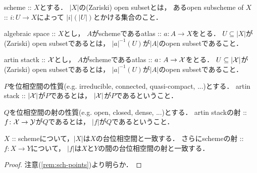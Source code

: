 \documentclass[a4paper, dvipdfmx]{jsarticle}
\begin{document}
\begin{Def}
\begin{myenum}
    \item
        scheme :: $X$とする．
        $|X|$の(Zariski) open subsetとは，
        あるopen subscheme of $X$ :: $i \colon U \to X$によって
        $|i|(|U|)$とかける集合のこと．

    \item
        algebraic space :: $X$とし，
        $A$がschemeであるatlas :: $a \colon A \to X$をとる．
        $U \subseteq |X|$が(Zariski) open subsetであるとは，
        $|a|^{-1}(U)$が$|A|$のopen subsetであること．

    \item
        artin stactk :: $\mathcal{X}$とし，
        $A$がschemeであるatlas :: $a \colon A \to \mathcal{X}$をとる．
        $U \subseteq |\mathcal{X}|$が(Zariski) open subsetであるとは，
        $|a|^{-1}(U)$が$|A|$のopen subsetであること．
\end{myenum}
\end{Def}

\begin{Def}
    $P$を位相空間の性質(e.g. irreducible, connected, quasi-compact, ...)とする．
    artin stack :: $|\mathcal{X}|$が$P$であるとは，
    $|\mathcal{X}|$が$P$であるということ．

    $Q$を位相空間の射の性質(e.g. open, closed, dense, ...)とする．
    artin stackの射 :: $f \colon \mathcal{X} \to \mathcal{Y}$が$Q$であるとは，
    $|f|$が$Q$であるということ．
\end{Def}

\begin{Lemma}
    $X$ :: schemeについて，$|X|$は$X$の台位相空間と一致する．
    さらにschemeの射 :: $f \colon X \to Y$について，
    $|f|$は$X$と$Y$の間の台位相空間の射と一致する．
\end{Lemma}
\begin{proof}
    注意(\ref{rem:sch-points})より明らか．
\end{proof}
\end{document}
